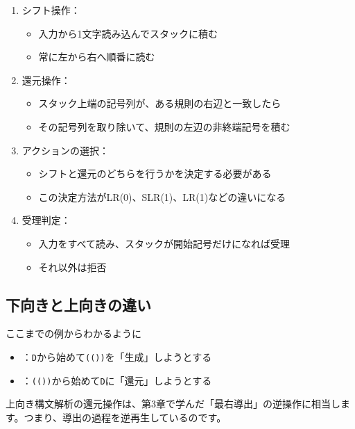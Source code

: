 \begin{enumerate}
\item
  シフト操作：

\begin{itemize}
\item
  入力から1文字読み込んでスタックに積む
\item
  常に左から右へ順番に読む
\end{itemize}

\item
  還元操作：

\begin{itemize}
\item
  スタック上端の記号列が、ある規則の右辺と一致したら
\item
  その記号列を取り除いて、規則の左辺の非終端記号を積む
\end{itemize}

\item
  アクションの選択：

\begin{itemize}
\item
  シフトと還元のどちらを行うかを決定する必要がある
\item
  この決定方法がLR(0)、SLR(1)、LR(1)などの違いになる
\end{itemize}

\item
  受理判定：

\begin{itemize}
\item
  入力をすべて読み、スタックが開始記号だけになれば受理
\item
  それ以外は拒否
\end{itemize}
\end{enumerate}

\subsection{下向きと上向きの違い}

ここまでの例からわかるように

\begin{itemize}
\item
  ：\texttt{D}から始めて\texttt{(())}を「生成」しようとする
\item
  ：\texttt{(())}から始めて\texttt{D}に「還元」しようとする
\end{itemize}

上向き構文解析の還元操作は、第3章で学んだ「最右導出」の逆操作に相当します。つまり、導出の過程を逆再生しているのです。

